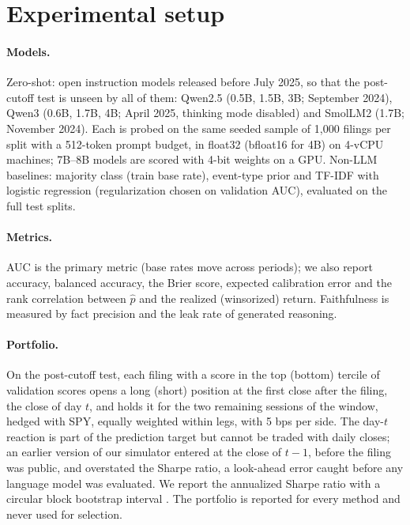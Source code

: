 \documentclass{article}
\begin{document}
\section{Experimental setup}
\label{sec:setup}

\paragraph{Models.}
Zero-shot: open instruction models released before July 2025, so that the post-cutoff test is unseen by all of them:
Qwen2.5 \citep{qwen2025qwen25} (0.5B, 1.5B, 3B; September 2024), Qwen3 \citep{qwen2025qwen3} (0.6B, 1.7B, 4B; April
2025, thinking mode disabled) and SmolLM2 \citep{benallal2025smollm2} (1.7B; November 2024). Each is probed on the
same seeded sample of 1{,}000 filings per split with a 512-token prompt budget, in float32 (bfloat16 for 4B) on
4-vCPU machines; 7B--8B models are scored with 4-bit weights on a GPU. Non-LLM baselines: majority class (train base
rate), event-type prior and TF-IDF with logistic regression (regularization chosen on validation AUC), evaluated on
the full test splits.

\paragraph{Metrics.}
AUC is the primary metric (base rates move across periods); we also report accuracy, balanced accuracy, the Brier
score, expected calibration error \citep{guo2017calibration} and the rank correlation between $\hat p$ and the realized
(winsorized) return. Faithfulness is measured by fact precision and the leak rate of generated reasoning.

\paragraph{Portfolio.}
On the post-cutoff test, each filing with a score in the top (bottom) tercile of validation scores opens a long
(short) position at the first close after the filing, the close of day $t$, and holds it for the two remaining
sessions of the window, hedged with SPY, equally weighted within legs, with 5 bps per side. The day-$t$ reaction is
part of the prediction target but cannot be traded with daily closes; an earlier version of our simulator entered at
the close of $t-1$, before the filing was public, and overstated the Sharpe ratio, a look-ahead error caught before
any language model was evaluated. We report
the annualized Sharpe ratio with a circular block bootstrap interval \citep{politis1992circular}. The portfolio is
reported for every method and never used for selection.
\end{document}
